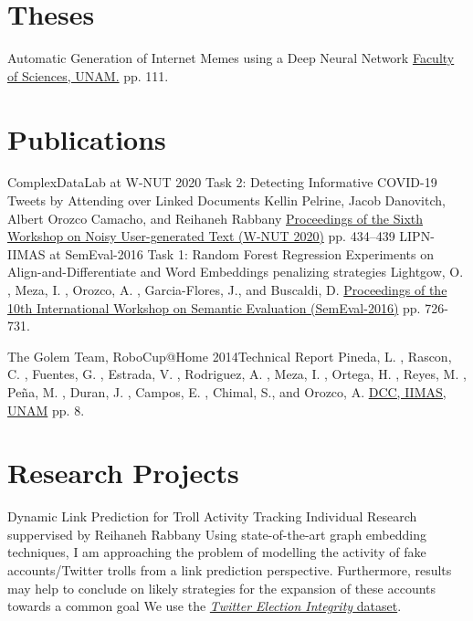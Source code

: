 \documentclass[11pt,a4paper,sans]{moderncv} %
\begin{document}
\section{Theses}

        {Automatic Generation of Internet Memes using a Deep Neural Network}
        {}{}{}
        {\href{http://132.248.9.195/ptd2018/febrero/0770173/}{Faculty of Sciences, UNAM.} pp. 111.}

\section{Publications}

        {ComplexDataLab at W-NUT 2020 Task 2: Detecting Informative COVID-19 Tweets by Attending over Linked Documents}
        {}{}{}
        {Kellin Pelrine, Jacob Danovitch, Albert Orozco Camacho, and Reihaneh Rabbany
         \href{https://www.aclweb.org/anthology/2020.wnut-1.63}{Proceedings of the Sixth Workshop on Noisy User-generated Text (W-NUT 2020)} pp. 434–439}
        {LIPN-IIMAS at SemEval-2016 Task 1: Random Forest Regression Experiments on Align-and-Differentiate and Word Embeddings penalizing strategies}
        {}{}{}
        {Lightgow, O. , Meza, I. , Orozco, A. , Garcia-Flores, J., and Buscaldi, D.
         \href{https://www.aclweb.org/anthology/S/S16/S16-1112.pdf}{Proceedings of the 10th International Workshop on Semantic Evaluation (SemEval-2016)} pp. 726-731.}

        {The Golem Team, RoboCup@Home 2014}{Technical Report}
        {}{}
        {Pineda, L. , Rascon, C. , Fuentes, G. , Estrada, V. , Rodriguez, A. , Meza, I. , Ortega, H. ,
         Reyes, M. , Peña, M. , Duran, J. , Campos, E. , Chimal, S., and Orozco, A.
         \href{http://golem.iimas.unam.mx/pubs/tdp_Golem-II+_2014.pdf}{DCC, IIMAS, UNAM} pp. 8.}

\section{Research Projects}


        {Dynamic Link Prediction for Troll Activity Tracking}
        {Individual Research}
        {suppervised by Reihaneh Rabbany}
        {Using state-of-the-art graph embedding techniques, I am approaching the problem
          of modelling the activity of fake accounts/Twitter trolls from a link prediction
          perspective. Furthermore, results may help to conclude on likely strategies for
          the expansion of these accounts towards a common goal}
        {We use the \href{https://transparency.twitter.com/en/reports/information-operations.html}{\emph{Twitter Election Integrity} dataset}.}
        
\end{document}
